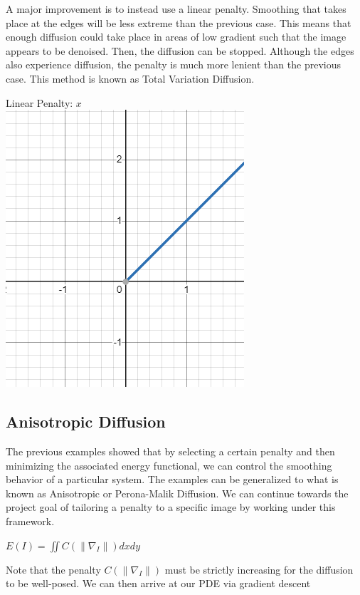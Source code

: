 \documentclass{article}
\begin{document}
  \noindent
  A major improvement is to instead use a linear penalty. Smoothing that takes place at the edges
  will be less extreme than the previous case. This means that enough diffusion could take place
  in areas of low gradient such that the image appears to be denoised. Then, the diffusion can be stopped.
  Although the edges also experience diffusion, the penalty is much more lenient than the previous case.
  This method is known as Total Variation Diffusion.
  \begin{center}
    Linear Penalty: $x$\\
    \vspace{12pt}
    \includegraphics[scale=0.5]{../report_images/linear.png}
  \end{center}

  \newpage
  \noindent
  \subsection{Anisotropic Diffusion}
  The previous examples showed that by selecting a certain penalty and then minimizing the
  associated energy functional, we can control the smoothing behavior of a particular system.
  The examples can be generalized to what is known as Anisotropic or Perona-Malik Diffusion.
  We can continue towards the project goal of tailoring a penalty to a specific image
  by working under this framework.
  \begin{center}
    $E(I) = \iint C(\| \nabla_{I} \|) dx dy$
  \end{center}
  Note that the penalty $C(\| \nabla_{I} \|)$
  must be strictly increasing for the diffusion to be well-posed. We can then
  arrive at our PDE via gradient descent\\
\end{document}
